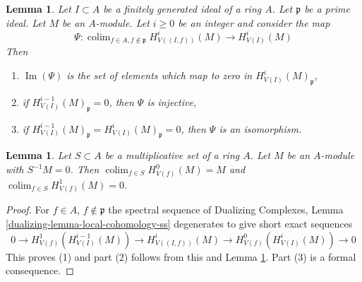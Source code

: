 \documentclass[10pt,a4paper]{amsart}
\theoremstyle{plain}
\newtheorem{lemma}[subsection]{Lemma}
\theoremstyle{definition}
\theoremstyle{remark}
\numberwithin{equation}{subsection}
\def\colim{\mathop{\mathrm{colim}}\nolimits}
\def\Im{\mathop{\mathrm{Im}}}
\begin{document}
\begin{lemma}
\label{lemma-elements-come-from-bigger}
Let $I \subset A$ be a finitely generated ideal of a ring $A$.
Let $\mathfrak p$ be a prime ideal. Let $M$ be an $A$-module.
Let $i \geq 0$ be an integer and consider the map
$$
\Psi :
\colim_{f \in A, f \not \in \mathfrak p} H^i_{V((I, f))}(M)
\longrightarrow
H^i_{V(I)}(M)
$$
Then
\begin{enumerate}
\item $\Im(\Psi)$ is the set of elements which map to zero in
$H^i_{V(I)}(M)_\mathfrak p$,
\item if $H^{i - 1}_{V(I)}(M)_\mathfrak p = 0$, then $\Psi$ is injective,
\item if $H^{i - 1}_{V(I)}(M)_\mathfrak p = H^i_{V(I)}(M)_\mathfrak p = 0$,
then $\Psi$ is an isomorphism.
\end{enumerate}
\end{lemma}

\begin{lemma}
\label{lemma-multiplicative}
Let $S \subset A$ be a multiplicative set of a ring $A$.
Let $M$ be an $A$-module with $S^{-1}M = 0$. Then
$\colim_{f \in S} H^0_{V(f)}(M) = M$ and
$\colim_{f \in S} H^1_{V(f)}(M) = 0$.
\end{lemma}

\begin{proof}
For $f \in A$, $f \not \in \mathfrak p$ the spectral sequence of
Dualizing Complexes, Lemma \ref{dualizing-lemma-local-cohomology-ss}
degenerates to give short exact sequences
$$
0 \to H^1_{V(f)}(H^{i - 1}_{V(I)}(M)) \to
H^i_{V((I, f))}(M) \to H^0_{V(f)}(H^i_{V(I)}(M)) \to 0
$$
This proves (1) and part (2) follows from this and
Lemma \ref{lemma-multiplicative}.
Part (3) is a formal consequence.
\end{proof}
\end{document}

